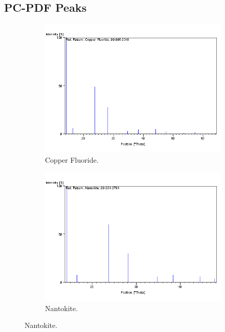 \documentclass{article}
\begin{document}
\begin{appendices}
\section{PC-PDF Peaks}
\label{appendix:PCPDFPeaks}
\begin{figure}[h]
	\centering
	\begin{subfigure}{0.45\textwidth}
		\centering
		\includegraphics[width=\textwidth]{Figures/CuF2Peaks.png}
		\caption{Copper Fluoride.}
		\label{fig:CuF2Peaks}
	\end{subfigure}
	\hfill
	\begin{subfigure}{0.45\textwidth}
		\centering
		\includegraphics[width=\textwidth]{Figures/NantokitePeaks.png}
		\caption{Nantokite.}
		\label{fig:NantokitePeaks}
	\end{subfigure}

\end{figure}
\end{appendices}
\end{document}
